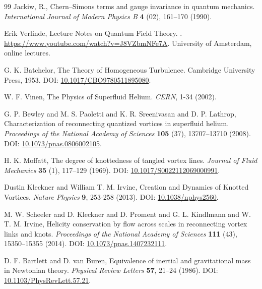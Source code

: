 \documentclass[12pt]{article}
\begin{document}
\begin{thebibliography}{99}
Jackiw, R.,
\newblock Chern--Simons terms and gauge invariance in quantum mechanics.
\textit{International Journal of Modern Physics B} \textbf{4} (02), 161--170 (1990).


Erik Verlinde,
\newblock Lecture Notes on Quantum Field Theory.
.
\newblock \url{https://www.youtube.com/watch?v=J8VZbmNFe7A}.
\newblock University of Amsterdam, online lectures.


G. K. Batchelor,
\newblock The Theory of Homogeneous Turbulence.
\newblock Cambridge University Press, 1953.
\newblock DOI: \href{https://doi.org/10.1017/CBO9780511895080}{10.1017/CBO9780511895080}.


W. F. Vinen,
\newblock The Physics of Superfluid Helium.
\textit{CERN}, 1-34 (2002).


G. P. Bewley and M. S. Paoletti and K. R. Sreenivasan and D. P. Lathrop,
\newblock Characterization of reconnecting quantized vortices in superfluid helium.
\textit{Proceedings of the National Academy of Sciences} \textbf{105} (37), 13707--13710 (2008).
\newblock DOI: \href{https://doi.org/10.1073/pnas.0806002105}{10.1073/pnas.0806002105}.


H. K. Moffatt,
\newblock The degree of knottedness of tangled vortex lines.
\textit{Journal of Fluid Mechanics} \textbf{35} (1), 117--129 (1969).
\newblock DOI: \href{https://doi.org/10.1017/S0022112069000991}{10.1017/S0022112069000991}.


Dustin Kleckner and William T. M. Irvine,
\newblock Creation and Dynamics of Knotted Vortices.
\textit{Nature Physics} \textbf{9}, 253-258 (2013).
\newblock DOI: \href{https://doi.org/10.1038/nphys2560}{10.1038/nphys2560}.


M. W. Scheeler and D. Kleckner and D. Proment and G. L. Kindlmann and W. T. M. Irvine,
\newblock Helicity conservation by flow across scales in reconnecting vortex links and knots.
\textit{Proceedings of the National Academy of Sciences} \textbf{111} (43), 15350--15355 (2014).
\newblock DOI: \href{https://doi.org/10.1073/pnas.1407232111}{10.1073/pnas.1407232111}.


D. F. Bartlett and D. van Buren,
\newblock Equivalence of inertial and gravitational mass in Newtonian theory.
\textit{Physical Review Letters} \textbf{57}, 21--24 (1986).
\newblock DOI: \href{https://doi.org/10.1103/PhysRevLett.57.21}{10.1103/PhysRevLett.57.21}.



\end{thebibliography}
\end{document}
